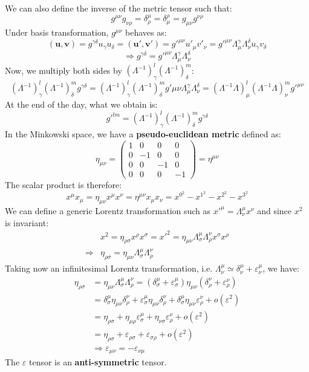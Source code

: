 \documentclass[../main.tex]{subfiles}
\begin{document}
We can also define the inverse of the metric tensor such that:
\[
g^{\mu\nu}g_{\nu\rho}=\delta^{\mu}_{\rho}=\delta_{\mu}^{\rho}=g_{\mu\nu}g^{\nu\rho}
\]
Under basis transformation, $g^{\mu\nu}$ behaves as:
\[
(\textbf{u},\textbf{v})=g^{\gamma\delta}u_\gamma u_\delta=(\textbf{u}',\textbf{v}')=g'^{\mu\nu}u'_\mu v'_\nu=g'^{\mu\nu}\Lambda^\gamma_\mu\Lambda^\delta_\nu u_\gamma v_\delta
\]
\[
\Rightarrow g^{\gamma\delta}=g'^{\mu\nu}\Lambda^\gamma_\mu\Lambda^\delta_\nu
\]
Now, we multiply both sides by $(\Lambda^{-1})^l_\gamma(\Lambda^{-1})^m_\delta$:
\[
(\Lambda^{-1})^l_\gamma(\Lambda^{-1})^m_\delta g^{\gamma\delta}=(\Lambda^{-1})^l_\gamma(\Lambda^{-1})^m_\delta g'{\mu\nu}\Lambda^\gamma_\mu\Lambda^\delta_\nu=(\Lambda^{-1}\Lambda)^l_\mu(\Lambda^{-1}\Lambda)^m_\nu g'^{\mu\nu}
\]
At the end of the day, what we obtain is:
\[
g'^{lm}=(\Lambda^{-1})^l_{\gamma}(\Lambda^{-1})^m_{\delta}g^{\gamma\delta}
\]
In the Minkowski space, we have a \textbf{pseudo-euclidean metric} defined as:
\[
\eta_{\mu\nu}=\begin{pmatrix}
1 & 0 & 0 & 0\\
0 & -1 & 0 & 0\\
0 & 0 & -1 & 0\\
0 & 0 & 0 & -1
\end{pmatrix}=\eta^{\mu\nu}
\]
The scalar product is therefore:
\[
x^{\mu}x_{\mu}=\eta_{\mu\nu}x^{\mu}x^{\nu}=\eta^{\mu\nu}x_{\mu}x_{\nu}=x^{0^2}-x^{1^2}-x^{2^2}-x^{3^2}
\]
We can define a generic Lorentz transformation such as $x'^{\mu}=\Lambda^{\mu}_{\nu}x^{\nu}$ and since $x^2$ is invariant:
\begin{align*}
&x^2=\eta_{\rho\sigma}x^{\rho}x^{\sigma}=x'^2=\eta_{\mu\nu}\Lambda^{\mu}_{\sigma}\Lambda^{\nu}_{\rho}x^{\sigma}x^{\rho}\\
\Rightarrow&\eta_{\rho\sigma}=\eta_{\mu\nu}\Lambda^{\mu}_{\sigma}\Lambda^{\nu}_{\rho}
\end{align*}
Taking now an infinitesimal Lorentz transformation, i.e. $\Lambda^\mu_\nu\simeq\delta^\mu_\nu+\varepsilon^\mu_\nu$, we have:
\begin{align*}
\eta_{\rho\sigma}&=\eta_{\mu\nu}\Lambda^{\mu}_{\sigma}\Lambda^{\nu}_{\rho}=(\delta^\mu_\sigma+\varepsilon^\mu_\sigma)\eta_{\mu\nu}(\delta^\nu_\rho+\varepsilon^\nu_\rho)\\
&=\delta^\mu_\sigma\eta_{\mu\nu}\delta^\nu_\rho+\varepsilon^\mu_\sigma\eta_{\mu\nu}\delta^\nu_\rho+\delta^\mu_\sigma\eta_{\mu\nu}\varepsilon^\nu_\rho+o(\varepsilon^2)\\
&=\eta_{\rho\sigma}+\eta_{\mu\rho}\varepsilon^\mu_\sigma+\eta_{\nu\sigma}\varepsilon^\nu_\rho+o(\varepsilon^2)\\
&=\eta_{\rho\sigma}+\varepsilon_{\rho\sigma}+\varepsilon_{\sigma\rho}+o(\varepsilon^2)\\
&\Rightarrow \varepsilon_{\mu\nu}=-\varepsilon_{\nu\mu}
\end{align*}
The $\varepsilon$ tensor is an \textbf{anti-symmetric} tensor.
\end{document}
